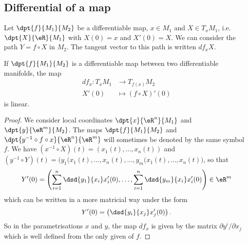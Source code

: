 \subsection{Differential of a map}

Let $\dpt{f}{M_1}{M_2}$ be a differentiable map, $x\in M_1$ and $X\in T_xM_1$, i.e. $\dpt{X}{\eR}{M_1}$ with $X(0)=x$ and $X'(0)=X$. We can consider the path $Y=f\circ X$ in $M_2$. The tangent vector to this path is written $df_x X$.

\begin{proposition}
If $\dpt{f}{M_1}{M_2}$ is a differentiable map between two differentiable manifolds, the map
		\begin{equation}
		\begin{aligned}
			df_x \colon T_xM_1 &\to T_{f(x)}M_2\\
			X'(0)&\mapsto (f\circ X)'(0)
		\end{aligned}
	\end{equation}
is linear.
\end{proposition}

\begin{proof}
We consider local coordinates $\dpt{x}{\eR^n}{M_1}$ and $\dpt{y}{\eR^m}{M_2}$. The maps $\dpt{f}{M_1}{M_2}$ and $\dpt{y^{-1}\circ f\circ x}{\eR^n}{\eR^m}$ will sometimes be denoted by the same symbol $f$. We have $(x^{-1}\circ X)(t)=(x_1(t),\ldots,x_n(t))$ and $(y^{-1}\circ Y)(t)=\big( y_1(x_1(t),\ldots,x_n(t),\ldots, y_m(x_1(t),\ldots,x_n(t)  \big)$, so that
\[
  Y'(0)=\left(   \sum_{i=1}^n \dsd{y_1}{x_i}x_i'(0),\ldots,\sum_{i=1}^n \dsd{y_m}{x_i}x_i'(0)   \right)\in\eR^m
\]
which can be written in a more matricial way under the form
\[
   Y'(0)=\left( \dsd{y_i}{x_j}x'_j(0) \right).
\]
So in the parametrisations $x$ and $y$, the map $df_x$ is given by the matrix $\partial y^i/\partial x_j$ which is well defined from the only given of $f$.
\end{proof}


